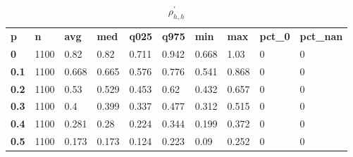 \begin{table}[h]
 \centering 
\footnotesize
\caption{$\rho_{h,h}^\prime $}
\label{tab:alphahh}
\begin{tabular}[h]{| l l l l l l l l l l|
    } \hline
\textbf{ p} & \textbf{ n} & \textbf{ avg} & \textbf{ med} & \textbf{ q025} & \textbf{ q975} & \textbf{ min} & \textbf{ max} & \textbf{ pct\_0} & \textbf{ pct\_nan}
           \\
  \textbf{  0} & 1100 &  0.82 &  0.82 & 0.711 & 0.942 & 0.668 &  1.03 & 0 & 0
           \\
  \textbf{0.1} & 1100 & 0.668 & 0.665 & 0.576 & 0.776 & 0.541 & 0.868 & 0 & 0
           \\
  \textbf{0.2} & 1100 &  0.53 & 0.529 & 0.453 &  0.62 & 0.432 & 0.657 & 0 & 0
           \\
  \textbf{0.3} & 1100 &   0.4 & 0.399 & 0.337 & 0.477 & 0.312 & 0.515 & 0 & 0
           \\
  \textbf{0.4} & 1100 & 0.281 &  0.28 & 0.224 & 0.344 & 0.199 & 0.372 & 0 & 0
           \\
  \textbf{0.5} & 1100 & 0.173 & 0.173 & 0.124 & 0.223 &  0.09 & 0.252 & 0 & 0
           \\
 \hline \end{tabular}
 \end{table}
